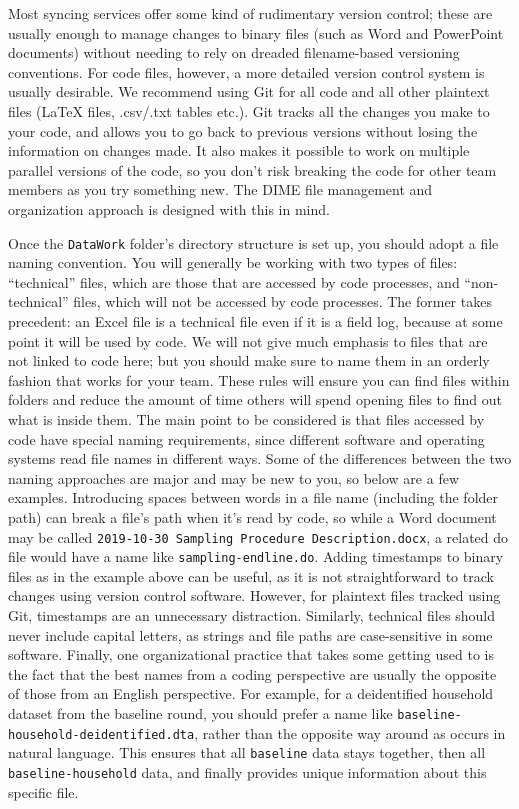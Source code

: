 Most syncing services offer some kind of rudimentary version control;
these are usually enough to manage changes to binary files (such as Word and PowerPoint documents)
without needing to rely on dreaded filename-based versioning conventions.
For code files, however, a more detailed version control system is usually desirable.
We recommend using Git for all code and all other plaintext files ({\LaTeX} files, .csv/.txt tables etc.).
Git tracks all the changes you make to your code,
and allows you to go back to previous versions without losing the information on changes made.
It also makes it possible to work on multiple parallel versions of the code,
so you don't risk breaking the code for other team members as you try something new.
The DIME file management and organization approach is designed with this in mind.

Once the \texttt{DataWork} folder's directory structure is set up,
you should adopt a file naming convention.
You will generally be working with two types of files:
``technical'' files, which are those that are accessed by code processes,
and ``non-technical'' files, which will not be accessed by code processes.
The former takes precedent: an Excel file is a technical file
even if it is a field log, because at some point it will be used by code.
We will not give much emphasis to files that are not linked to code here;
but you should make sure to name them in an orderly fashion that works for your team.
These rules will ensure you can find files within folders
and reduce the amount of time others will spend opening files
to find out what is inside them.
The main point to be considered is that files accessed by code have special naming requirements,
since different software and operating systems read file names in different ways.
Some of the differences between the two naming approaches are major and may be new to you,
so below are a few examples.
Introducing spaces between words in a file name (including the folder path)
can break a file's path when it's read by code,
so while a Word document may be called \texttt{2019-10-30 Sampling Procedure Description.docx},
a related do file would have a name like \texttt{sampling-endline.do}.
Adding timestamps to binary files as in the example above can be useful,
as it is not straightforward to track changes using version control software.
However, for plaintext files tracked using Git, timestamps are an unnecessary distraction.
Similarly, technical files should never include capital letters,
as strings and file paths are case-sensitive in some software.
Finally, one organizational practice that takes some getting used to
is the fact that the best names from a coding perspective
are usually the opposite of those from an English perspective.
For example, for a deidentified household dataset from the baseline round,
you should prefer a name like \texttt{baseline-household-deidentified.dta},
rather than the opposite way around as occurs in natural language.
This ensures that all \texttt{baseline} data stays together,
then all \texttt{baseline-household} data,
and finally provides unique information about this specific file.

